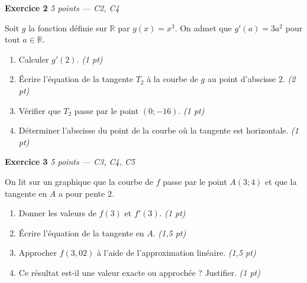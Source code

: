 \textbf{Exercice 2} \hfill \textit{5 points — C2, C4}

Soit $g$ la fonction définie sur $\mathbb{R}$ par $g(x) = x^3$. On admet que $g'(a) = 3a^2$ pour tout $a \in \mathbb{R}$.

\begin{enumerate}
  \item Calculer $g'(2)$. \hfill \textit{(1 pt)}
  \item Écrire l'équation de la tangente $T_2$ à la courbe de $g$ au point d'abscisse $2$. \hfill \textit{(2 pt)}
  \item Vérifier que $T_2$ passe par le point $(0;-16)$. \hfill \textit{(1 pt)}
  \item Déterminer l'abscisse du point de la courbe où la tangente est horizontale. \hfill \textit{(1 pt)}
\end{enumerate}


\bigskip

\textbf{Exercice 3} \hfill \textit{5 points — C3, C4, C5}

On lit sur un graphique que la courbe de $f$ passe par le point $A(3;4)$ et que la tangente en $A$ a pour pente $2$.

\begin{enumerate}
  \item Donner les valeurs de $f(3)$ et $f'(3)$. \hfill \textit{(1 pt)}
  \item Écrire l'équation de la tangente en $A$. \hfill \textit{(1,5 pt)}
  \item Approcher $f(3{,}02)$ à l'aide de l'approximation linéaire. \hfill \textit{(1,5 pt)}
  \item Ce résultat est-il une valeur exacte ou approchée ? Justifier. \hfill \textit{(1 pt)}
\end{enumerate}


